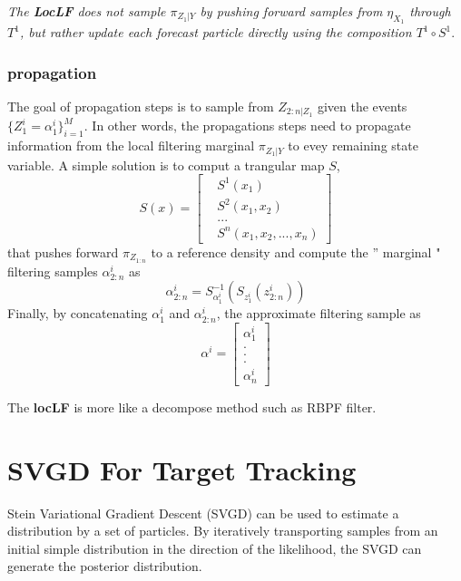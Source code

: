 \documentclass[	DIV=calc,%
							paper=letter,%
							fontsize=12pt%
                            ]{scrartcl}	 					%
\begin{document}
\emph{The \textbf{LocLF} does not sample $\pi_{Z_1|Y}$ by pushing forward samples from $\eta_{X_1}$ through $T^1$, but rather update each forecast particle directly using the composition $T^1 \circ S^1$}.
\subsubsection{propagation}
The goal of propagation steps is to sample from $Z_{2:n|Z_1}$ given the events $\{Z_1^i = \alpha_1^i \}_{i=1}^M$. In other words, the propagations steps need to propagate information from the local filtering marginal $\pi_{Z_1|Y}$ to evey remaining state variable.  A simple solution is to comput a trangular map $S$,
\begin{equation}
S(x) =
\begin{bmatrix}
& S^1(x_1) \\
& S^2(x_1,x_2)\\
& ... \\
& S^n(x_1,x_2,...,x_n)
\end{bmatrix}
\end{equation}
that pushes forward $\pi_{Z_{1:n}}$ to a reference density and compute the '' marginal "
filtering samples $\alpha_{2:n}^i$ as
\begin{equation}
\alpha_{2:n}^i = S_{\alpha_1^i}^{-1}(S_{z_1^i}(z_{2:n}^i))
\end{equation}
Finally, by concatenating $\alpha_1^i$ and $\alpha_{2:n}^i$, the approximate filtering sample as
\begin{equation}
\alpha^i =
\begin{bmatrix}
\alpha_1^i \\
.\\
.\\
.\\
\alpha_n^i
\end{bmatrix}
\end{equation}


The \textbf{locLF} is more like a decompose method such as RBPF filter.
\section{SVGD For Target Tracking }

Stein Variational Gradient Descent (SVGD) \cite{liu2016stein} can be used to estimate a distribution by a set of particles. By iteratively transporting samples from an initial simple distribution in the direction of the likelihood, the SVGD can generate the posterior distribution.
\end{document}
